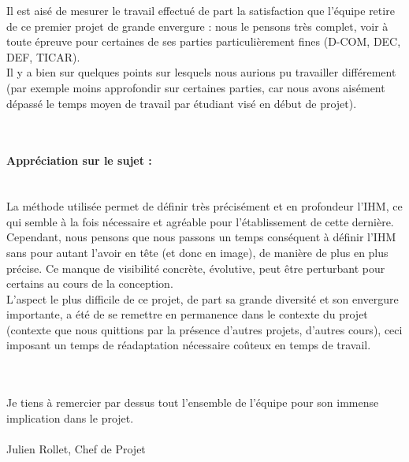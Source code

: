 \documentclass{report}
\begin{document}
Il est aisé de mesurer le travail effectué de part la satisfaction que l'équipe retire de ce premier projet de grande envergure : nous le pensons très complet, voir à toute épreuve pour certaines de ses parties particulièrement fines (D-COM, DEC, DEF, TICAR).\\

Il y a bien sur quelques points sur lesquels nous aurions pu travailler différement (par exemple moins approfondir sur certaines parties, car nous avons aisément dépassé le temps moyen de travail par étudiant visé en début de projet).

~~\\

\paragraph{\textbf{Appréciation sur le sujet :}}
~~\\

La méthode utilisée permet de définir très précisément et en profondeur l'IHM, ce qui semble à la fois nécessaire et agréable pour l'établissement de cette dernière.\\

Cependant, nous pensons que nous passons un temps conséquent à définir l'IHM sans pour autant l'avoir en tête (et donc en image), de manière de plus en plus précise. Ce manque de visibilité concrète, évolutive, peut être perturbant pour certains au cours de la conception.\\

L'aspect le plus difficile de ce projet, de part sa grande diversité et son envergure importante, a été de se remettre en permanence dans le contexte du projet (contexte que nous quittions par la présence d'autres projets, d'autres cours), ceci imposant un temps de réadaptation nécessaire coûteux en temps de travail.

~~\\

\paragraph{}

Je tiens à remercier par dessus tout l'ensemble de l'équipe pour son immense implication dans le projet.
~~\\
~~\\

\hfill Julien Rollet, Chef de Projet
\end{document}
